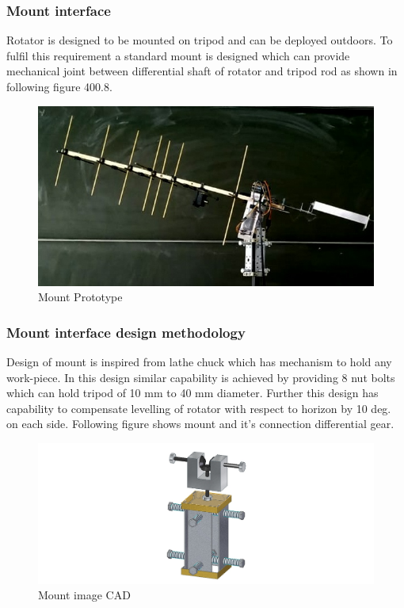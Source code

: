 \subsubsection{Mount interface}
Rotator is designed to be mounted on tripod and can be deployed outdoors. To fulfil this requirement a standard mount is designed which can provide mechanical joint between differential shaft of rotator and tripod rod as shown in following figure 400.8.  
\begin{figure}[H]
	\centering
	\includegraphics[width=\linewidth]{../art/real image.jpeg}
	\caption{Mount Prototype}
\end{figure}

\subsubsection*{Mount interface design methodology}
Design of mount is inspired from lathe chuck which has mechanism to hold any work-piece. In this design similar capability is achieved by providing 8 nut bolts which can hold tripod of 10 mm to 40 mm diameter. Further this design has capability to compensate levelling of rotator with respect to horizon by 10 deg. on each side. Following figure shows mount and it’s connection differential gear.   

\begin{figure}[H]
	\centering
	\includegraphics[width=0.9\linewidth]{../art/m.jpg}
	\caption{Mount image CAD}
\end{figure}

